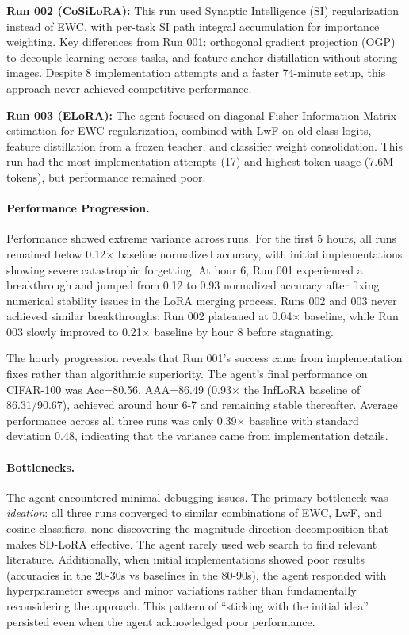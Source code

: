 \documentclass[11pt]{article}
\theoremstyle{plain}
\theoremstyle{definition}
\theoremstyle{remark}
\begin{document}
\textbf{Run 002 (CoSiLoRA):} This run used Synaptic Intelligence (SI) regularization instead of EWC, with per-task SI path integral accumulation for importance weighting. Key differences from Run 001: orthogonal gradient projection (OGP) to decouple learning across tasks, and feature-anchor distillation without storing images. Despite 8 implementation attempts and a faster 74-minute setup, this approach never achieved competitive performance.

\textbf{Run 003 (ELoRA):} The agent focused on diagonal Fisher Information Matrix estimation for EWC regularization, combined with LwF on old class logits, feature distillation from a frozen teacher, and classifier weight consolidation. This run had the most implementation attempts (17) and highest token usage (7.6M tokens), but performance remained poor.

\paragraph{Performance Progression.} Performance showed extreme variance across runs. For the first 5 hours, all runs remained below 0.12$\times$ baseline normalized accuracy, with initial implementations showing severe catastrophic forgetting. At hour 6, Run 001 experienced a breakthrough and jumped from 0.12 to 0.93 normalized accuracy after fixing numerical stability issues in the LoRA merging process. Runs 002 and 003 never achieved similar breakthroughs: Run 002 plateaued at 0.04$\times$ baseline, while Run 003 slowly improved to 0.21$\times$ baseline by hour 8 before stagnating.

The hourly progression reveals that Run 001's success came from implementation fixes rather than algorithmic superiority. The agent's final performance on CIFAR-100 was Acc=80.56, AAA=86.49 (0.93$\times$ the InfLoRA baseline of 86.31/90.67), achieved around hour 6-7 and remaining stable thereafter. Average performance across all three runs was only 0.39$\times$ baseline with standard deviation 0.48, indicating that the variance came from implementation details.

\paragraph{Bottlenecks.} The agent encountered minimal debugging issues. The primary bottleneck was \textit{ideation}: all three runs converged to similar combinations of EWC, LwF, and cosine classifiers, none discovering the magnitude-direction decomposition that makes SD-LoRA effective. The agent rarely used web search to find relevant literature. Additionally, when initial implementations showed poor results (accuracies in the 20-30s vs baselines in the 80-90s), the agent responded with hyperparameter sweeps and minor variations rather than fundamentally reconsidering the approach. This pattern of ``sticking with the initial idea'' persisted even when the agent acknowledged poor performance.
\end{document}
